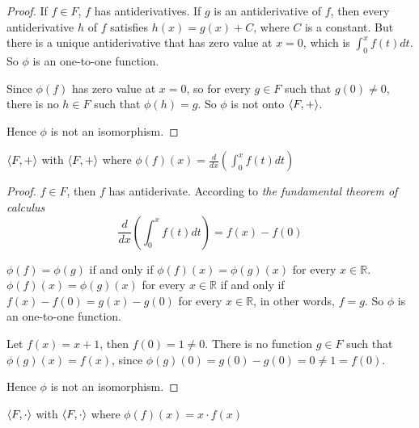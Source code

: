 \begin{proof}
    If $f\in F$, $f$ has antiderivatives. If $g$ is an antiderivative of $f$, then every antiderivative $h$ of $f$ satisfies $h(x) = g(x) + C$, where $C$ is a constant. But there is a unique antiderivative that has zero value at $x = 0$, which is $\int^{x}_{0}f(t)dt$. So $\phi$ is an one-to-one function.

    Since $\phi(f)$ has zero value at $x = 0$, so for every $g\in F$ such that $g(0)\ne 0$, there is no $h\in F$ such that $\phi(h) = g$. So $\phi$ is not onto $\left\langle{F,+}\right\rangle$.

    Hence $\phi$ is not an isomorphism.
\end{proof}

\begin{exercise}
    $\left\langle{F,+}\right\rangle$ with $\left\langle{F,+}\right\rangle$ where $\phi(f)(x) = \frac{d}{dx}\left(\int^{x}_{0} f(t)dt\right)$
\end{exercise}

\begin{proof}
    $f\in F$, then $f$ has antiderivate. According to \textit{the fundamental theorem of calculus}
    \[
        \frac{d}{dx}\left(\int^{x}_{0}f(t)dt\right) = f(x) - f(0)
    \]

    $\phi(f) = \phi(g)$ if and only if $\phi(f)(x) = \phi(g)(x)$ for every $x\in\mathbb{R}$. $\phi(f)(x) = \phi(g)(x)$ for every $x\in\mathbb{R}$ if and only if $f(x) - f(0) = g(x) - g(0)$ for every $x\in\mathbb{R}$, in other words, $f = g$. So $\phi$ is an one-to-one function.

    Let $f(x) = x + 1$, then $f(0) = 1\ne 0$. There is no function $g\in F$ such that $\phi(g)(x) = f(x)$, since $\phi(g)(0) = g(0) - g(0) = 0 \ne 1 = f(0)$.

    Hence $\phi$ is not an isomorphism.
\end{proof}

\begin{exercise}
    $\left\langle{F,\cdot}\right\rangle$ with $\left\langle{F,\cdot}\right\rangle$ where $\phi(f)(x) = x\cdot f(x)$
\end{exercise}

